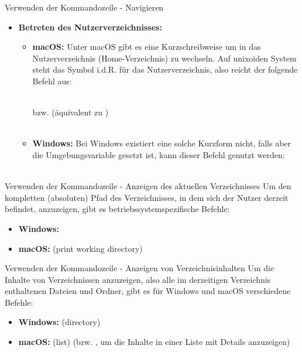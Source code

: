       \begin{frame}{Verwenden der Kommandozeile - Navigieren}
        
        \begin{itemize}
         
            \item \textbf{Betreten des Nutzerverzeichnisses:}
                
                \begin{itemize}
                    \item \textbf{macOS:} Unter macOS gibt es eine Kurzschreibweise um in das Nutzerverzeichnis (Home-Verzeichnis) zu wechseln. Auf unixoiden System steht das Symbol \code{$\sim$} i.d.R. für das Nutzerverzeichnis, also reicht der folgende Befehl aus: \\~\
                
                     bzw.  (äquivalent zu ) \\~\
                    
                    \item \textbf{Windows:} Bei Windows existiert eine solche Kurzform nicht, falls aber die Umgebungsvariable  gesetzt ist, kann dieser Befehl genutzt werden: \\~\
                
                \end{itemize}
                
        \end{itemize}
    \end{frame}
    
    \begin{frame}{Verwenden der Kommandozeile - Anzeigen des aktuellen Verzeichnisses}
        Um den kompletten (absoluten) Pfad des Verzeichnisses, in dem sich der Nutzer derzeit befindet, anzuzeigen, gibt es betriebssystemspezifische Befehle:
        
        \begin{itemize}
            \item \textbf{Windows:} 
            \item \textbf{macOS:}  (print working directory)
        \end{itemize}
    \end{frame}
    
    \begin{frame}{Verwenden der Kommandozeile - Anzeigen von Verzeichnisinhalten}
        Um die Inhalte von Verzeichnissen anzuzeigen, also alle im derzeitigen Verzeichnis enthaltenen Dateien und Ordner, gibt es für Windows und macOS verschiedene Befehle:
        
        \begin{itemize}
            \item \textbf{Windows:}  (directory)
            \item \textbf{macOS:}  (list) (bzw. , um die Inhalte in einer Liste mit Details anzuzeigen)
        \end{itemize}
    \end{frame}
    
